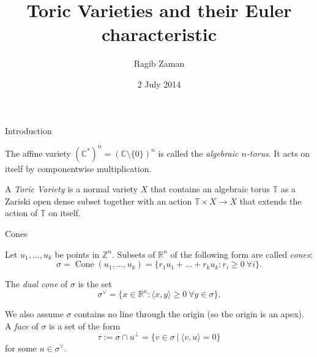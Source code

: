 \documentclass{beamer}
\title{Toric Varieties and their Euler characteristic}
\author{Ragib Zaman}
\institute{AMSSC at the University of Newcastle}
\date{2 July 2014}
\newcommand{\C}{\mathbb{C}}
\newcommand{\V}{\vee}
\begin{document}
\begin{frame}
\titlepage
\end{frame}


\begin{frame}{Introduction}

\begin{Definition}
The affine variety $(\mathbb{C}^*)^n = (\C\setminus\{0\})^n$ is called the {\em algebraic $n$-torus}. It acts on itself by componentwise multiplication.
\end{Definition}


\begin{Definition}
 A {\em Toric Variety} is a normal variety $X$ that contains an algebraic torus $\mathbb{T}$ as a Zariski open dense subset together with an action $\mathbb{T} \times X \to X$ that extends the action of $\mathbb{T}$ on itself. 
\end{Definition}


\end{frame}

\begin{frame}{Cones}
\begin{Definition}
Let $u_1,\ldots, u_k$ be points in $\mathbb{Z}^n.$ Subsets of $\mathbb{R}^n$ of the following form are called {\em cones}: $$\sigma = \operatorname{Cone}(u_1,\ldots, u_k) = \{ r_1 u_1 + \ldots + r_k u_k : r_i \geq 0 \  \forall i \}.$$

The {\em dual cone} of $\sigma$ is the set $$\sigma^{\vee}=\{ x\in \mathbb{R}^n : \langle x, y\rangle \geq 0 \ \forall y\in \sigma\}.$$

We also assume $\sigma$ contains no line through the origin (so the origin is an apex). A {\em face} of $\sigma$ is a set of the form $$\tau := \sigma \cap u^{\perp} =\{ v\in \sigma \ | \ \langle v, u \rangle =0 \}$$ for some $u\in \sigma^{\V} .$ 


\end{Definition}

\end{frame}
\end{document}
